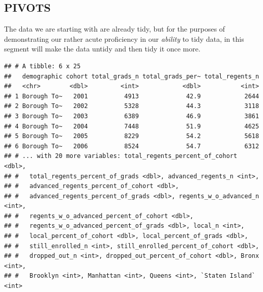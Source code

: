 \documentclass[
  english,
  man, fleqn, noextraspace]{apa6}
\newenvironment{Shaded}{\begin{snugshade}}{\end{snugshade}}
\newcommand{\DataTypeTok}[1]{\textcolor[rgb]{0.13,0.29,0.53}{#1}}
\newcommand{\KeywordTok}[1]{\textcolor[rgb]{0.13,0.29,0.53}{\textbf{#1}}}
\newcommand{\NormalTok}[1]{#1}
\newcommand{\OperatorTok}[1]{\textcolor[rgb]{0.81,0.36,0.00}{\textbf{#1}}}
\newcommand{\StringTok}[1]{\textcolor[rgb]{0.31,0.60,0.02}{#1}}
\begin{document}
\hypertarget{pivots}{%
\subsection{PIVOTS}\label{pivots}}

The data we are starting with are already tidy, but for the purposes of demonstrating our rather acute proficiency in our \emph{ability} to tidy data, in this segment will make the data untidy and then tidy it once more.

\begin{Shaded}
\end{Shaded}

\begin{verbatim}
## # A tibble: 6 x 25
##   demographic cohort total_grads_n total_grads_per~ total_regents_n
##   <chr>        <dbl>         <int>            <dbl>           <int>
## 1 Borough To~   2001          4913             42.9            2644
## 2 Borough To~   2002          5328             44.3            3118
## 3 Borough To~   2003          6389             46.9            3861
## 4 Borough To~   2004          7448             51.9            4625
## 5 Borough To~   2005          8229             54.2            5618
## 6 Borough To~   2006          8524             54.7            6312
## # ... with 20 more variables: total_regents_percent_of_cohort <dbl>,
## #   total_regents_percent_of_grads <dbl>, advanced_regents_n <int>,
## #   advanced_regents_percent_of_cohort <dbl>,
## #   advanced_regents_percent_of_grads <dbl>, regents_w_o_advanced_n <int>,
## #   regents_w_o_advanced_percent_of_cohort <dbl>,
## #   regents_w_o_advanced_percent_of_grads <dbl>, local_n <int>,
## #   local_percent_of_cohort <dbl>, local_percent_of_grads <dbl>,
## #   still_enrolled_n <int>, still_enrolled_percent_of_cohort <dbl>,
## #   dropped_out_n <int>, dropped_out_percent_of_cohort <dbl>, Bronx <int>,
## #   Brooklyn <int>, Manhattan <int>, Queens <int>, `Staten Island` <int>
\end{verbatim}
\end{document}
